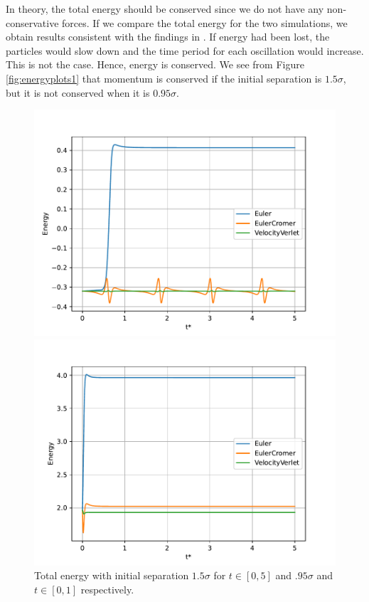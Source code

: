 \documentclass[a4paper,10pt,english]{article}
\begin{document}
\newpage

In theory, the total energy should be conserved since we do not have any non-conservative forces. If we compare the total energy for the two simulations, we obtain results consistent with the findings in \textit{}. If energy had been lost, the particles would slow down and the time period for each oscillation would increase. This is not the case. Hence, energy is conserved. We see from Figure \ref{fig:energyplots1} that momentum is conserved if the initial separation is $1.5 \sigma$, but it is not conserved when it is $0.95 \sigma$.

\begin{figure}[h]
    \centering
    \begin{minipage}{0.5\textwidth}
        \centering
        \includegraphics[width=1.05\textwidth]{../figures/2_c_iv_15.pdf}
    \end{minipage}\hfill
    \begin{minipage}{0.5\textwidth}
        \centering
        \includegraphics[width=1.05\textwidth]{../figures/2_c_iv_095.pdf}
    \end{minipage}
    \caption{Total energy with initial separation $1.5\sigma$ for $t\in[0, 5]$ and $.95\sigma$ and $t\in[0, 1]$ respectively.}
    \label{fig:energyplots2}
\end{figure}
\end{document}
